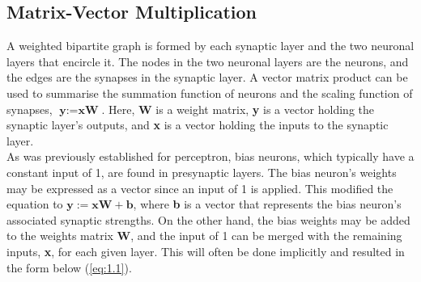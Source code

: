 \subsection[Matrix-Vector Multiplication]{Matrix-Vector Multiplication}

A weighted bipartite graph is formed by each synaptic layer and the two neuronal layers that encircle it. The nodes in the two neuronal layers are the neurons, and the edges are the synapses in the synaptic layer. A vector matrix product can be used to summarise the summation function of neurons and the scaling function of synapses, $\textbf{y} := \textbf{xW}$. Here, \textbf{W} is a weight matrix, \textbf{y} is a vector holding the synaptic layer's outputs, and \textbf{x} is a vector holding the inputs to the synaptic layer. \\

\noindent As was previously established for perceptron, bias neurons, which typically have a constant input of 1, are found in presynaptic layers. The bias neuron's weights may be expressed as a vector since an input of 1 is applied. This modified the equation to $\textbf{y} := \textbf{xW} + \textbf{b}$, where \textbf{b} is a vector that represents the bias neuron's associated synaptic strengths. On the other hand, the bias weights may be added to the weights matrix \textbf{W}, and the input of 1 can be merged with the remaining inputs, \textbf{x}, for each given layer. This will often be done implicitly and resulted in the form below (\ref{eq:1.1}).
\\

